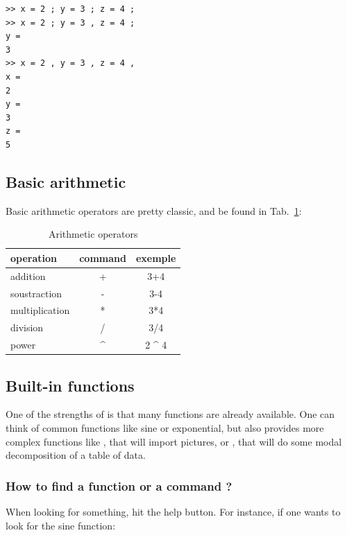 \begin{lstlisting}
>> x = 2 ; y = 3 ; z = 4 ;
>> x = 2 ; y = 3 , z = 4 ;
y = 
3
>> x = 2 , y = 3 , z = 4 ,
x = 
2
y = 
3
z = 
5
\end{lstlisting}

	\subsection{Basic arithmetic}
		Basic arithmetic operators are pretty classic, and be found in Tab.~\ref{tab-basic_arithmetic}:
		\begin{table}[h!]\caption{Arithmetic operators}
			\label{tab-basic_arithmetic}
			\center
			\begin{tabular}{|l|c|c|}
				\hline
				operation & command & exemple \\
				\hline
				addition & + & 3+4 \\
				soustraction & - & 3-4 \\
				multiplication & * & 3*4 \\
				division & / & 3/4 \\
				power & \^{} & 2 \^{} 4 \\
				\hline
			\end{tabular}
		\end{table}

	\subsection{Built-in functions}
		One of the strengths of \matlab is that many functions are already available.
		One can think of common functions like sine or exponential, but \matlab also provides more complex functions like , that will import pictures, or , that will do some modal decomposition of a table of data.

		\subsubsection{How to find a function or a command ?}
			When looking for something, hit the help button.
			For instance, if one wants to look for the sine function:

